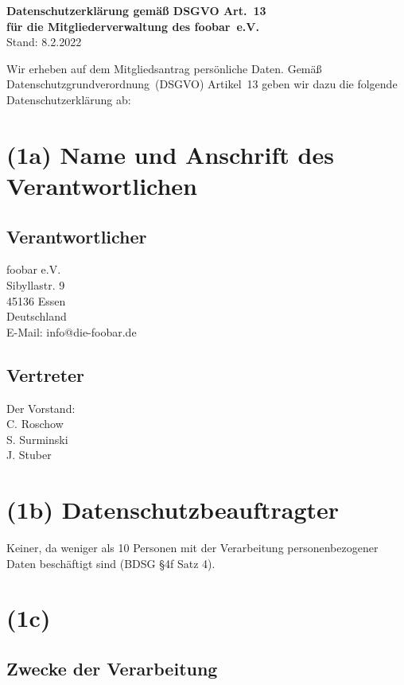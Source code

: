 \documentclass[10pt,a4paper]{scrartcl}
\begin{document}
	\noindent
	{\huge\bfseries Datenschutzerklärung gemäß DSGVO Art.~13\\
		für die Mitgliederverwaltung des foobar~e.V.}\\[0.5cm]
	Stand: 8.2.2022
\vspace{1cm}

\noindent Wir erheben auf dem Mitgliedsantrag persönliche Daten.
Gemäß Datenschutzgrundverordnung~(DSGVO) Artikel~13 geben wir dazu die
folgende Datenschutzerklärung ab:


\section*{(1a) Name und Anschrift des Verantwortlichen}

\subsection*{Verantwortlicher}

foobar e.V.\\
Sibyllastr. 9\\
45136 Essen\\
Deutschland\\[2ex]
E-Mail: info@die-foobar.de


\subsection*{Vertreter}

Der Vorstand:\\[2ex]
C. Roschow\\
S. Surminski\\
J. Stuber


\section*{(1b) Datenschutzbeauftragter}

Keiner, da weniger als 10 Personen mit der Verarbeitung
personenbezogener Daten beschäftigt sind (BDSG §4f Satz 4).


\section*{(1c)}

\subsection*{Zwecke der Verarbeitung}
\end{document}
